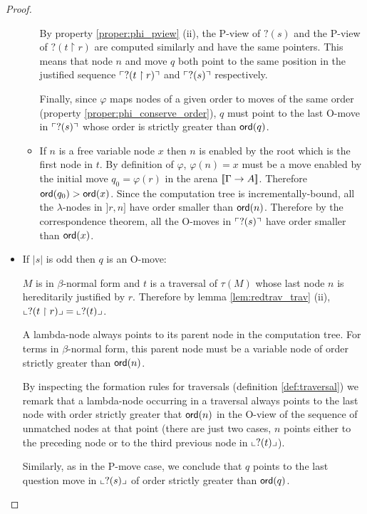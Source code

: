 \begin{proof}
\begin{itemize}
\begin{itemize}
By property \ref{proper:phi_pview} (ii), the P-view of $?(s)$ and
the P-view of $?(t \upharpoonright r)$ are computed similarly and
have the same pointers. This means that node $n$ and  move $q$ both
point to the same position in the justified sequence
$\ulcorner ?(t\upharpoonright r) \urcorner$ and $\ulcorner ?(s) \urcorner$ respectively.

Finally, since $\varphi$ maps nodes of a given order to moves of the
same order (property \ref{proper:phi_conserve_order}), $q$ must
point to the last O-move in $\ulcorner ?(s) \urcorner$ whose order is strictly
greater than ${\sf ord}(q)$.


\item If $n$ is a free variable node $x$ then $n$ is enabled by the root which is the first node in $t$.
By definition of $\varphi$, $\varphi(n) = x$ must be a move enabled
by the initial move $q_0 = \varphi(r)$ in the arena ${[\![ \Gamma
\rightarrow A ]\!]}$. Therefore ${\sf ord}(q_0) > {\sf ord}(x)$. Since the
computation tree is incrementally-bound, all the $\lambda$-nodes in
$]r,n]$ have order smaller than ${\sf ord}(n)$. Therefore by the
correspondence theorem, all the O-moves in $\ulcorner ?(s) \urcorner$ have order
smaller than ${\sf ord}(x)$.
\end{itemize}



\item If $|s|$ is odd then $q$ is an O-move:

$M$ is in $\beta$-normal form and $t$ is a traversal of $\tau(M)$
whose last node $n$ is hereditarily justified by $r$. Therefore by
lemma \ref{lem:redtrav_trav} (ii), $ \llcorner ?(t \upharpoonright r) \lrcorner
= \llcorner ?(t) \lrcorner$.

A lambda-node always points to its parent node in the computation
tree. For terms in $\beta$-normal form, this parent node must be a
variable node of order strictly greater than ${\sf ord}(n)$.

By inspecting the formation rules for traversals (definition
\ref{def:traversal}) we remark that a lambda-node occurring in a
traversal always points to the last node with order strictly greater
that ${\sf ord}(n)$ in the O-view of the sequence of unmatched nodes at
that point (there are just two cases, $n$ points either to the
preceding node or to the third previous node in $\llcorner ?(t) \lrcorner$).

Similarly, as in the P-move case, we conclude that $q$ points to the
last question move in $\llcorner ?(s) \lrcorner$ of order strictly greater than
${\sf ord}(q)$.
\end{itemize}


\end{proof}
